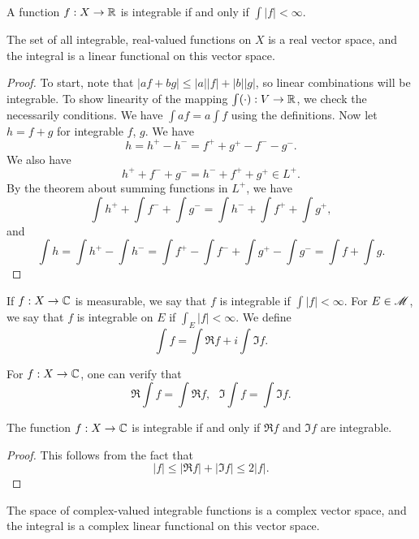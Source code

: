 \documentclass[12pt]{article} %
\begin{document}
\begin{proposition}
    A function $f : X \to \mathbb{R}$ is integrable if and only if $\int |f| < \infty$.
\end{proposition}

\begin{proposition}
    The set of all integrable, real-valued functions on $X$ is a real vector space, and the integral is a linear functional on this vector space.
\end{proposition}

\begin{proof}
    To start, note that $|af + bg| \leq |a||f| + |b||g|$, so linear combinations will be integrable. To show linearity of the mapping $\int (\cdot) : V \to \mathbb{R}$, we check the necessarily conditions. We have $\int a f = a \int f$ using the definitions. Now let $h = f + g$ for integrable $f$, $g$. We have \[h = h^+ - h^- = f^+ + g^+ - f^- - g^-.\] We also have \[h^+ + f^- + g^- = h^- + f^+ + g^+ \in L^+.\] By the theorem about summing functions in $L^+$, we have \[\int h^+ + \int f^- + \int g^- = \int h^- + \int f^+ + \int g^+,\] and \[\int h = \int h^+ - \int h^- = \int f^+ - \int f^-  +\int g^+ - \int g^- = \int f + \int g.\]
\end{proof}

\begin{definition}
    If $f : X \to \mathbb{C}$ is measurable, we say that $f$ is integrable if $\int |f| < \infty$. For $E \in \mathscr{M}$, we say that $f$ is integrable on $E$ if $\int_E |f| < \infty$. We define \[\int f = \int \Re f + i \int \Im f.\]
\end{definition}

\begin{remark}
    For $f : X \to \mathbb{C}$, one can verify that \[\Re \int f = \int \Re f, \ \ \ \Im \int f = \int \Im f.\]
\end{remark}

\begin{proposition}
    The function $f: X \to \mathbb{C}$ is integrable if and only if $\Re f$ and $\Im f$ are integrable. 
\end{proposition}

\begin{proof}
    This follows from the fact that \[|f| \leq |\Re f| + |\Im f| \leq 2|f|.\]
\end{proof}

\begin{proposition}
    The space of complex-valued integrable functions is a complex vector space, and the integral is a complex linear functional on this vector space.
\end{proposition}
\end{document}
